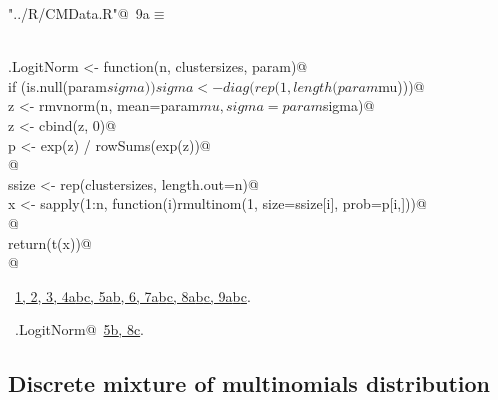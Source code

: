 \documentclass[reqno]{amsart}
\renewcommand{\NWtarget}[2]{\hypertarget{#1}{#2}}
\renewcommand{\NWlink}[2]{\hyperlink{#1}{#2}}
\begin{document}
\begin{flushleft} \small\label{scrap16}\raggedright\small
\NWtarget{nuweb9a}{} \verb@"../R/CMData.R"@\nobreak\ {\footnotesize {9a}}$\equiv$
\vspace{-1ex}
\begin{list}{}{} \item
\mbox{}\verb@@\\
\mbox{}\verb@mg.LogitNorm <- function(n, clustersizes, param){@\\
\mbox{}\verb@  if (is.null(param$sigma)) sigma <- diag(rep(1,length(param$mu)))@\\
\mbox{}\verb@  z <- rmvnorm(n, mean=param$mu, sigma=param$sigma)@\\
\mbox{}\verb@  z <- cbind(z, 0)@\\
\mbox{}\verb@  p <- exp(z) / rowSums(exp(z))@\\
\mbox{}\verb@  @\\
\mbox{}\verb@  ssize <- rep(clustersizes, length.out=n)@\\
\mbox{}\verb@  x <- sapply(1:n, function(i)rmultinom(1, size=ssize[i], prob=p[i,]))@\\
\mbox{}\verb@  @\\
\mbox{}\verb@  return(t(x))@\\
\mbox{}\verb@}@\\
\mbox{}\verb@@{\NWsep}
\end{list}
\vspace{-1.5ex}
\footnotesize
\begin{list}{}{\setlength{\itemsep}{-\parsep}\setlength{\itemindent}{-\leftmargin}}
\item \NWtxtFileDefBy\ \NWlink{nuweb1}{1}\NWlink{nuweb2}{, 2}\NWlink{nuweb3}{, 3}\NWlink{nuweb4a}{, 4a}\NWlink{nuweb4b}{b}\NWlink{nuweb4c}{c}\NWlink{nuweb5a}{, 5a}\NWlink{nuweb5b}{b}\NWlink{nuweb6}{, 6}\NWlink{nuweb7a}{, 7a}\NWlink{nuweb7b}{b}\NWlink{nuweb7c}{c}\NWlink{nuweb8a}{, 8a}\NWlink{nuweb8b}{b}\NWlink{nuweb8c}{c}\NWlink{nuweb9a}{, 9a}\NWlink{nuweb9b}{b}\NWlink{nuweb9c}{c}.
\item \NWtxtIdentsDefed\nobreak\  \verb@mg.LogitNorm@\nobreak\ \NWlink{nuweb5b}{5b}\NWlink{nuweb8c}{, 8c}.
\item{}
\end{list}
\vspace{4ex}
\end{flushleft}
\subsection{Discrete mixture of multinomials distribution}
\end{document}
